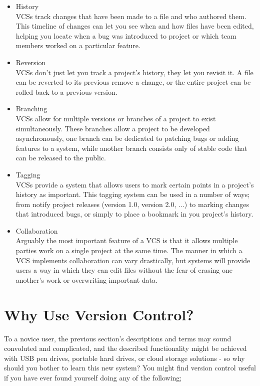 \documentclass[11pt, a4paper, titlepage]{article}
\begin{document}
\begin{itemize}
\item History\\
VCSs track changes that have been made to a file and who authored them.
This timeline of changes can let you see when and how files have been edited,
helping you locate when a bug was introduced to project or which team members
worked on a particular feature.
\item Reversion\\
VCSs don't just let you track a project's history, they let you revisit it. 
A file can be reverted to its previous remove a change, or the entire project
can be rolled back to a previous version.
\item Branching\\
VCSs allow for multiple versions or branches of a project to exist
simultaneously. 
These branches allow a project to be developed asynchronously, one branch can
be dedicated to patching bugs or adding features to a system, while another
branch consists only of stable code that can be released to the public.
\item Tagging\\
VCSs provide a system that allows users to mark certain points in a project's
history as important.
This tagging system can be used in a number of ways; from notify project
releases (version 1.0, version 2.0, ...) to marking changes that introduced
bugs, or simply to place a bookmark in you project's history.
\item Collaboration\\
Arguably the most important feature of a VCS is that it allows multiple
parties work on a single project at the same time.
The manner in which a VCS implements collaboration can vary drastically, but
systems will provide users a way in which they can edit files without the
fear of erasing one another's work or overwriting important data.
\end{itemize}



\section{Why Use Version Control?} 
To a novice user, the previous section's descriptions and terms may sound
convoluted and complicated, and the described functionality might be achieved
with USB pen drives, portable hard drives, or cloud storage solutions - so why
should you bother to learn this new system?  
You might find version control useful if you have ever found yourself doing
any of the following;
\end{document}
